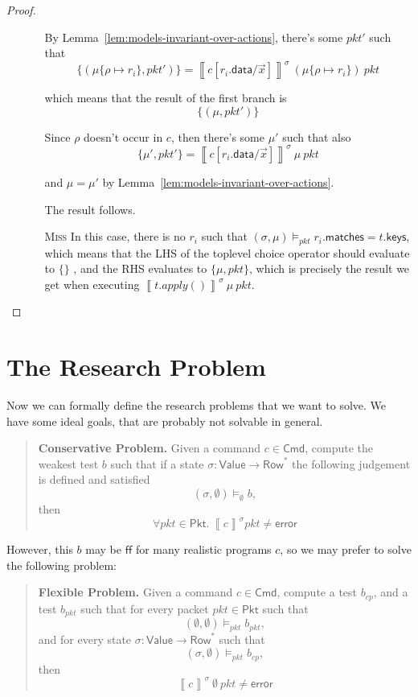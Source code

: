\documentclass{article}
\newcommand{\pkt}{\mathit{pkt}}
\newcommand{\error}{\mathsf{error}}
\newcommand{\denote}[1]{\left\llbracket#1\right\rrbracket}
\newcommand{\FALSE}{\mathsf{ff}}
\newcommand{\Value}{\mathsf{Value}}
\newcommand{\Cmd}{\mathsf{Cmd}}
\newcommand{\Pkt}{\mathsf{Pkt}}
\newcommand{\Row}{\mathsf{Row}}
\newcommand{\matches}{\mathsf{matches}}
\newcommand{\keys}{\mathsf{keys}}
\newcommand{\data}{\mathsf{data}}
\newcommand{\satisfy}[3]{({#1,#3}) \models_{#2}}
\begin{document}
\begin{proof}
\begin{enumerate}[align=left]
\begin{enumerate}
      By Lemma~\ref{lem:models-invariant-over-actions}, there's some $\pkt'$ such that
      \[\{(\mu\{\rho \mapsto r_i\}, \pkt')\} =
      \denote{c[r_i.\data/\vec x]}^\sigma~(\mu\{\rho \mapsto r_i\})~\pkt
      \]

      which means that the result of the first branch is
      \[\{(\mu, \pkt')\} \]

      Since $\rho$ doesn't occur in $c$, then there's some $\mu'$ such that also
      \[\{\mu', \pkt'\} = \denote{c[r_i.\data/\vec x]}^\sigma~\mu~\pkt \]

      and $\mu = \mu'$ by Lemma~\ref{lem:models-invariant-over-actions}.

      The result follows.

    \item[\textsc{Miss}] In this case, there is no $r_i$ such that
      $\satisfy\sigma\pkt\mu r_i.\matches = t.\keys$, which means that the LHS
      of the toplevel choice operator should evaluate to $\{\}$ , and the RHS evaluates to $\{\mu,\pkt\}$, which
      is precisely the result we get when executing
      $\denote{t.apply()}^\sigma~\mu~\pkt$.

    \end{enumerate}

  \end{enumerate}
\end{proof}



\section{The Research Problem}

Now we can formally define the research problems that we want to solve. We have
some ideal goals, that are probably not solvable in general.

\begin{quote}
  \textbf{Conservative Problem.} Given a command $c \in \Cmd$, compute the weakest test
  $b$ such that if a state $\sigma : \Value \to \Row^*$ the following
  judgement is defined and satisfied \[\satisfy\sigma\emptyset\emptyset b,\] then \[\forall \pkt \in \Pkt.~
  \denote{c}^\sigma \pkt \neq \error \]
\end{quote}

However, this $b$ may be $\FALSE$ for many realistic programs $c$, so we may
prefer to solve the following problem:

\begin{quote}
  \textbf{Flexible Problem.} Given a command $c \in \Cmd$, compute a test
  $b_{\mathit{cp}}$, and a test $b_{\mathit{pkt}}$ such that
  for every packet $\pkt \in \Pkt$ such that
  \[\satisfy \emptyset \pkt \emptyset b_{\mathit{pkt}},\]
  and for every state $\sigma : \Value \to \Row^*$ such that
  \[\satisfy \sigma \pkt \emptyset b_{\mathit{cp}},\]
  then \[\denote{c}^\sigma ~\emptyset~\pkt \neq \error \]
\end{quote}
\end{document}
